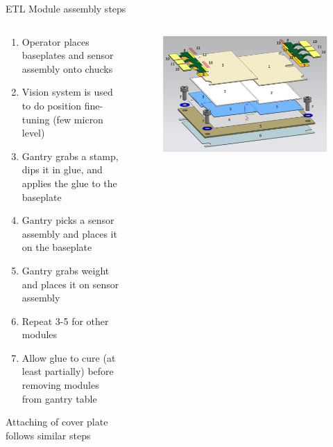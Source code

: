 \documentclass[english,aspectratio=43,8pt]{beamer}
\begin{document}
\begin{frame}{ETL Module assembly steps}
    \begin{columns}
    \begin{column}{0.5\textwidth}
    \begin{enumerate}
        \item Operator places baseplates and sensor assembly onto chucks
        \item Vision system is used to do position fine-tuning (few micron level)
        \item Gantry grabs a stamp, dips it in glue, and applies the glue to the baseplate
        \item Gantry picks a sensor assembly and places it on the baseplate
        \item Gantry grabs weight and places it on sensor assembly
        \item Repeat 3-5 for other modules
        \item Allow glue to cure (at least partially) before removing modules from gantry table
    \end{enumerate}
    Attaching of cover plate follows similar steps
    \end{column}
    \begin{column}{0.5\textwidth}
        \begin{figure}
            \includegraphics[width=\textwidth]{figures/ETL_module.png}
        \end{figure}
    \end{column}
\end{columns}
\end{frame}
\end{document}
